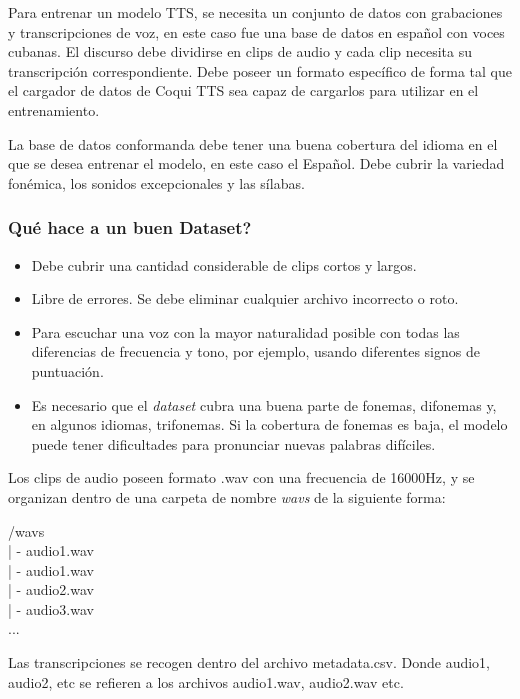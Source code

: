 Para entrenar un modelo TTS, se necesita un conjunto de datos con grabaciones y transcripciones de voz, en este caso fue una base de datos en español con voces cubanas. El discurso debe dividirse en clips de audio y cada clip necesita su transcripción correspondiente. Debe poseer un formato específico de forma tal que el cargador de datos de Coqui TTS sea capaz de cargarlos para utilizar en el entrenamiento.    

La base de datos conformanda debe tener una buena cobertura del idioma en el que se desea entrenar el modelo, en este caso el Español. Debe cubrir la variedad fonémica, los sonidos excepcionales y las sílabas. 

\subsubsection{Qué hace a un buen Dataset?}

\begin{itemize}
	\item Debe cubrir una cantidad considerable de clips cortos y largos.
	\item Libre de errores. Se debe eliminar cualquier archivo incorrecto o roto. 
	\item Para escuchar una voz con la mayor naturalidad posible con todas las diferencias de frecuencia y tono, por ejemplo, usando diferentes signos de puntuación.
	\item Es necesario que el \textit{dataset} cubra una buena parte de fonemas, difonemas y, en algunos idiomas, trifonemas. Si la cobertura de fonemas es baja, el modelo puede tener dificultades para pronunciar nuevas palabras difíciles.
	
\end{itemize}

Los clips de audio poseen formato .wav con una frecuencia de 16000Hz, y se organizan dentro de una carpeta de nombre \textit{wavs} de la siguiente forma:

\begin{center}
	/wavs\\
	| - audio1.wav\\
	| - audio1.wav\\
	| - audio2.wav\\
	| - audio3.wav\\
	...
\end{center}

Las transcripciones se recogen dentro del archivo metadata.csv. Donde audio1, audio2, etc se refieren a los archivos audio1.wav, audio2.wav etc.

